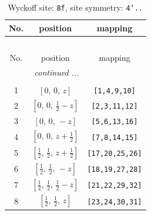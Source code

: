 \documentclass[fleqn,8pt]{jsarticle}
\begin{document}
\begin{longtable}{ccc}
\caption{Wyckoff site: {\tt 8f}, site symmetry: {\tt 4'..}}
 \\
 \hline \hline
No. & position & mapping \\ \hline \endfirsthead

\multicolumn{2}{l}{\tablename\ \thetable{}} \\
 \hline \hline
No. & position & mapping \\ \hline \endhead

 \hline \hline
\multicolumn{2}{r}{\footnotesize\it continued ...} \\ \endfoot

 \hline \hline
\multicolumn{2}{r}{} \\ \endlastfoot

1 & $\left[ 0,\, 0,\, z \right]$ & {\tt [1,4,9,10]} \\ \hline
2 & $\left[ 0,\, 0,\, \frac{1}{2} - z \right]$ & {\tt [2,3,11,12]} \\ \hline
3 & $\left[ 0,\, 0,\, - z \right]$ & {\tt [5,6,13,16]} \\ \hline
4 & $\left[ 0,\, 0,\, z + \frac{1}{2} \right]$ & {\tt [7,8,14,15]} \\ \hline
5 & $\left[ \frac{1}{2},\, \frac{1}{2},\, z + \frac{1}{2} \right]$ & {\tt [17,20,25,26]} \\ \hline
6 & $\left[ \frac{1}{2},\, \frac{1}{2},\, - z \right]$ & {\tt [18,19,27,28]} \\ \hline
7 & $\left[ \frac{1}{2},\, \frac{1}{2},\, \frac{1}{2} - z \right]$ & {\tt [21,22,29,32]} \\ \hline
8 & $\left[ \frac{1}{2},\, \frac{1}{2},\, z \right]$ & {\tt [23,24,30,31]} \\
\end{longtable}
\renewcommand{\arraystretch}{1.2}
\end{document}
